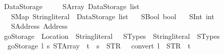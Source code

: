 \begin{isabellebody}
\isadelimdocument
%
\endisadelimdocument
%
\isatagdocument
%
\isamarkuptrue%
%
\endisatagdocument
{\isafolddocument}%
%
\isadelimdocument
%
\endisadelimdocument
{}\isamarkupfalse%
\ Data\isactrlsub S\isactrlsub t\isactrlsub o\isactrlsub r\isactrlsub a\isactrlsub g\isactrlsub e\ {\isacharequal}{\kern0pt}\isanewline
\ \ \ \ SArray\ {\isachardoublequoteopen}Data\isactrlsub S\isactrlsub t\isactrlsub o\isactrlsub r\isactrlsub a\isactrlsub g\isactrlsub e\ list{\isachardoublequoteclose}\isanewline
\ \ {\isacharbar}{\kern0pt}\ SMap\ {\isachardoublequoteopen}{\isacharparenleft}{\kern0pt}String{\isachardot}{\kern0pt}literal\ {\isasymtimes}\ Data\isactrlsub S\isactrlsub t\isactrlsub o\isactrlsub r\isactrlsub a\isactrlsub g\isactrlsub e{\isacharparenright}{\kern0pt}\ list{\isachardoublequoteclose}\isanewline
\ \ {\isacharbar}{\kern0pt}\ SBool\ bool\isanewline
\ \ {\isacharbar}{\kern0pt}\ SInt\ int\isanewline
\ \ {\isacharbar}{\kern0pt}\ SAddress\ Address\isanewline
\isanewline
{}\isamarkupfalse%
\ go\isactrlsub S\isactrlsub t\isactrlsub o\isactrlsub r\isactrlsub a\isactrlsub g\isactrlsub e\ {\isacharcolon}{\kern0pt}{\isacharcolon}{\kern0pt}\ {\isachardoublequoteopen}Location\ {\isasymRightarrow}\ {\isacharparenleft}{\kern0pt}String{\isachardot}{\kern0pt}literal\ {\isasymtimes}\ \ STypes{\isacharparenright}{\kern0pt}\ {\isasymRightarrow}\ {\isacharparenleft}{\kern0pt}String{\isachardot}{\kern0pt}literal\ {\isasymtimes}\ STypes{\isacharparenright}{\kern0pt}{\isachardoublequoteclose}\ \isanewline
\ \ {\isachardoublequoteopen}go\isactrlsub S\isactrlsub t\isactrlsub o\isactrlsub r\isactrlsub a\isactrlsub g\isactrlsub e\ l\ {\isacharparenleft}{\kern0pt}s{\isacharcomma}{\kern0pt}\ STArray\ {\isacharunderscore}{\kern0pt}\ t{\isacharparenright}{\kern0pt}\ {\isacharequal}{\kern0pt}\ {\isacharparenleft}{\kern0pt}s\ {\isacharplus}{\kern0pt}\ {\isacharparenleft}{\kern0pt}STR\ {\isacharprime}{\kern0pt}{\isacharprime}{\kern0pt}{\isacharbrackleft}{\kern0pt}{\isacharprime}{\kern0pt}{\isacharprime}{\kern0pt}{\isacharparenright}{\kern0pt}\ {\isacharplus}{\kern0pt}\ {\isacharparenleft}{\kern0pt}convert\ l{\isacharparenright}{\kern0pt}\ {\isacharplus}{\kern0pt}\ {\isacharparenleft}{\kern0pt}STR\ {\isacharprime}{\kern0pt}{\isacharprime}{\kern0pt}{\isacharbrackright}{\kern0pt}{\isacharprime}{\kern0pt}{\isacharprime}{\kern0pt}{\isacharparenright}{\kern0pt}{\isacharcomma}{\kern0pt}\ t{\isacharparenright}{\kern0pt}{\isachardoublequoteclose}\isanewline

\end{isabellebody}
